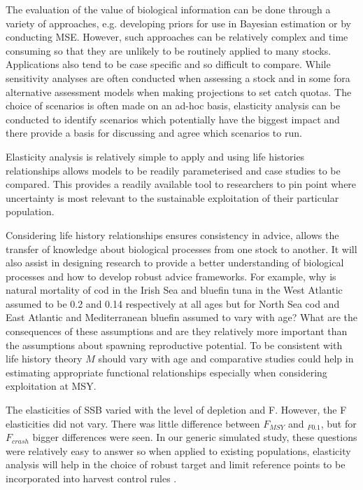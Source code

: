 \documentclass{pnastwo}
\begin{document}
\begin{article}
The evaluation of the value of biological information can be done through a variety of approaches,
e.g. developing priors for use in Bayesian estimation or by conducting MSE.
However, such approaches can be relatively complex and time consuming so that they are
unlikely to be routinely applied to many stocks. Applications also tend to be case specific and so difficult
to compare. While sensitivity analyses are often conducted when assessing a stock and in
some fora alternative assessment models when making projections to set catch quotas. The 
choice of scenarios is often made on an ad-hoc basis, elasticity analysis can be conducted
to identify scenarios which potentially have the biggest impact and there provide a
basis for discussing and agree which scenarios to run.

Elasticity analysis is relatively simple to apply and using life histories 
relationships allows models to be readily parameterised and case studies to be compared. This provides 
a readily available tool to researchers to pin point where uncertainty is most relevant to the sustainable 
exploitation of their particular population. 

Considering life history relationships ensures consistency in advice, allows the transfer of
knowledge about biological processes from one stock to another. It will also assist
in designing research to provide a better understanding of biological processes and
how to develop robust advice frameworks. For example, why is natural mortality of cod in the Irish Sea and bluefin tuna
in the West Atlantic assumed to be 0.2 and 0.14 respectively at all ages but for North Sea
cod and East Atlantic and Mediterranean bluefin assumed to vary with age?
What are the consequences of these assumptions and are they relatively more important than
the assumptions about spawning reproductive potential. To be consistent with life history theory $M$
should vary with age and comparative studies could help in estimating appropriate
functional relationships especially when considering exploitation at MSY.

The elasticities of SSB varied with the level of depletion and F. However, the F elasticities
did not vary. There was little difference between $F_{MSY}$ and $_{F0.1}$, but for $F_{crash}$
bigger differences were seen. In our generic simulated study, these questions were
relatively easy to answer so when applied to existing populations, elasticity analysis
will help in the choice of robust target and limit reference points to be incorporated into harvest control rules .


\end{article}
\end{document}
